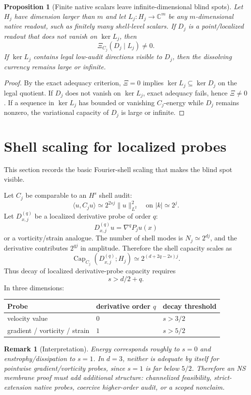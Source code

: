 \documentclass[11pt]{article}
\newtheorem{proposition}{Proposition}
\newtheorem{remark}{Remark}
\begin{document}
\begin{proposition}[Finite native scalars leave infinite-dimensional blind spots]
Let $H_j$ have dimension larger than $m$ and let $L_j:H_j\to\mathbb C^m$ be any $m$-dimensional native readout, such as finitely many shell-level scalars.  If $D_j$ is a point/localized readout that does not vanish on $\ker L_j$, then
\[
\Xi_{C_j}(D_j\mid L_j)\ne0.
\]
If $\ker L_j$ contains legal low-audit directions visible to $D_j$, then the dissolving currency remains large or infinite.
\end{proposition}

\begin{proof}
By the exact adequacy criterion, $\Xi=0$ implies $\ker L_j\subseteq\ker D_j$ on the legal quotient.  If $D_j$ does not vanish on $\ker L_j$, exact adequacy fails, hence $\Xi\ne0$.  If a sequence in $\ker L_j$ has bounded or vanishing $C_j$-energy while $D_j$ remains nonzero, the variational capacity of $D_j$ is large or infinite.
\end{proof}

\section{Shell scaling for localized probes}
This section records the basic Fourier-shell scaling that makes the blind spot visible.

Let $C_j$ be comparable to an $H^s$ shell audit:
\[
\langle u,C_j u\rangle\simeq 2^{2sj}\|u\|_{L^2}^2
\quad\text{on } |k|\simeq 2^j.
\]
Let $D_{x,j}^{(q)}$ be a localized derivative probe of order $q$:
\[
D_{x,j}^{(q)}u=\nabla^q P_j u(x)
\]
or a vorticity/strain analogue.  The number of shell modes is $N_j\simeq 2^{dj}$, and the derivative contributes $2^{qj}$ in amplitude.  Therefore the shell capacity scales as
\[
\boxed{
\operatorname{Cap}_{C_j}(D_{x,j}^{(q)};H_j)
\simeq
2^{(d+2q-2s)j}.
}
\]
Thus decay of localized derivative-probe capacity requires
\[
\boxed{
s>d/2+q.
}
\]
In three dimensions:
\begin{center}
\begin{tabular}{lll}
\toprule
Probe & derivative order $q$ & decay threshold \\
\midrule
velocity value & $0$ & $s>3/2$ \\
gradient / vorticity / strain & $1$ & $s>5/2$ \\
\bottomrule
\end{tabular}
\end{center}

\begin{remark}[Interpretation]
Energy corresponds roughly to $s=0$ and enstrophy/dissipation to $s=1$.  In $d=3$, neither is adequate by itself for pointwise gradient/vorticity probes, since $s=1$ is far below $5/2$.  Therefore an NS membrane proof must add additional structure: channelized feasibility, strict-extension native probes, coercive higher-order audit, or a scoped nonclaim.
\end{remark}
\end{document}

